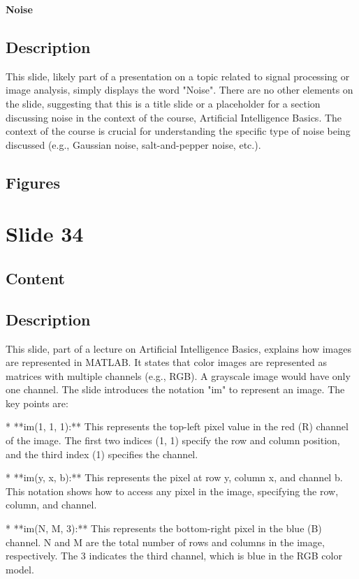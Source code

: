 \documentclass{article}%
\begin{document}
\textbf{Noise}
%
\subsection{Description}%
This slide, likely part of a presentation on a topic related to signal processing or image analysis, simply displays the word "Noise".  There are no other elements on the slide, suggesting that this is a title slide or a placeholder for a section discussing noise in the context of the course, Artificial Intelligence Basics.  The context of the course is crucial for understanding the specific type of noise being discussed (e.g., Gaussian noise, salt-and-pepper noise, etc.).%
\subsection{Figures}%
\begin{figure}[H]%
\centering%
\end{figure}

%
\newpage%
\section{Slide 34}%
\label{sec:Slide34}%
\subsection{Content}%
%
\subsection{Description}%

This slide, part of a lecture on Artificial Intelligence Basics, explains how images are represented in MATLAB.  It states that color images are represented as matrices with multiple channels (e.g., RGB).  A grayscale image would have only one channel.  The slide introduces the notation "im" to represent an image.  The key points are:

* **im(1, 1, 1):** This represents the top-left pixel value in the red (R) channel of the image.  The first two indices (1, 1) specify the row and column position, and the third index (1) specifies the channel.

* **im(y, x, b):** This represents the pixel at row y, column x, and channel b.  This notation shows how to access any pixel in the image, specifying the row, column, and channel.

* **im(N, M, 3):** This represents the bottom-right pixel in the blue (B) channel.  N and M are the total number of rows and columns in the image, respectively.  The 3 indicates the third channel, which is blue in the RGB color model.
\end{document}
